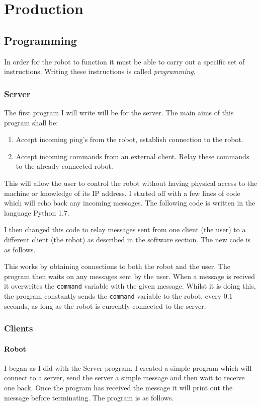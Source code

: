 \documentclass[]{report}   %
\begin{document}
		\chapter{Production}
			\section{Programming}
				In order for the robot to function it must be able to carry out a specific set of instructions. Writing these instructions is called \emph{programming}.
				
				\subsection{Server}
					The first program I will write will be for the server. The main aims of this program shall be:
					\begin{enumerate}
						\item Accept incoming ping's from the robot, establish connection to the robot.
						\item Accept incoming commands from an external client. Relay these commands to the already connected robot.
					\end{enumerate}
					This will allow the user to control the robot without having physical access to the machine or knowledge of its IP address. I started off with a
					few lines of code which will echo back any incoming messages. The following code is written in the language Python 1.7.
					
					I then changed this code to relay messages sent from one client (the user) to a different client (the robot) as described in the software section.
					The new code is as follows.
					
					This works by obtaining connections to both the robot and the user. The program then waits on any messages sent by the user. When a message is recived it
					overwrites the \lstinline{command} variable with the given message. Whilst it is doing this, the program constantly sends the \lstinline{command} variable to the robot,
					every 0.1 seconds, as long as the robot is currently connected to the server.
				
				\subsection{Clients}
					\subsubsection{Robot}
						I began as I did with the Server program. I created a simple program which will connect to a server, send the server a simple message and then wait to
						receive one back. Once the program has received the message it will print out the message before terminating. The program is as follows.
						
						
\end{document}

